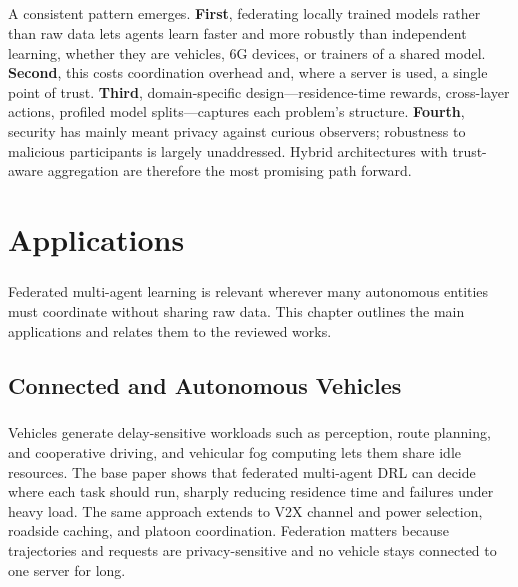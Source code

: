 \documentclass[12pt,a4paper,final]{extreport}
\begin{document}
\paragraph{} A consistent pattern emerges. \textbf{First}, federating locally trained models rather than raw data lets agents learn faster and more robustly than independent learning, whether they are vehicles, 6G devices, or trainers of a shared model. \textbf{Second}, this costs coordination overhead and, where a server is used, a single point of trust. \textbf{Third}, domain-specific design---residence-time rewards, cross-layer actions, profiled model splits---captures each problem's structure. \textbf{Fourth}, security has mainly meant privacy against curious observers; robustness to malicious participants is largely unaddressed. Hybrid architectures with trust-aware aggregation are therefore the most promising path forward.

\chapter{Applications}

\paragraph{} Federated multi-agent learning is relevant wherever many autonomous entities must coordinate without sharing raw data. This chapter outlines the main applications and relates them to the reviewed works.

\section{Connected and Autonomous Vehicles}

\paragraph{} Vehicles generate delay-sensitive workloads such as perception, route planning, and cooperative driving, and vehicular fog computing lets them share idle resources. The base paper \cite{p1} shows that federated multi-agent DRL can decide where each task should run, sharply reducing residence time and failures under heavy load. The same approach extends to V2X channel and power selection, roadside caching, and platoon coordination. Federation matters because trajectories and requests are privacy-sensitive and no vehicle stays connected to one server for long.
\end{document}
